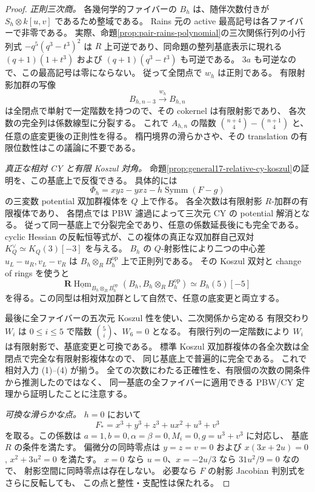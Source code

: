 \begin{proof}
\emph{正則三次商。}
各幾何学的ファイバーの $B_h$ は、随伴次数付きが
$S_h\otimes k[u,v]$ であるため整域である。
Rains 元の active 最高記号は各ファイバーで非零である。
実際、命題\ref{prop:pair-rains-polynomial}の三次関係行列の小行列式
$-q^5(q^3-t^3)^2$ は $R$ 上可逆であり、同命題の整列基底表示に現れる
$(q+1)(1+t^3)$ および $(q+1)(q^3-t^3)$ も可逆である。
$3a$ も可逆なので、この最高記号は零にならない。
従って全閉点で $w_h$ は正則である。
有限射影加群の写像
\[
 B_{h,n-3}\xrightarrow{w_h}B_{h,n}
\]
は全閉点で単射で一定階数を持つので、その cokernel は有限射影であり、
各次数の完全列は係数線型に分裂する。
これで $A_{h,n}$ の階数
$\binom{n+4}{4}-\binom{n+1}{4}$ と、任意の底変更後の正則性を得る。
楕円境界の滑らかさや、その translation の有限位数性はこの議論に不要である。

\emph{真正な相対 CY と有限 Koszul 対角。}
命題\ref{prop:general17-relative-cy-koszul}の証明を、この基底上で反復できる。
具体的には
\[
 \Phi_h=xyz-yxz-h\operatorname{Symm}(F-g)
\]
の三変数 potential 双加群複体を $Q$ 上で作る。
各全次数は有限射影 $R$-加群の有限複体であり、
各閉点では PBW 濾過によって三次元 CY の potential 解消となる。
従って同一基底上で分裂完全であり、任意の係数延長後にも完全である。
cyclic Hessian の反転恒等式が、この複体の真正な双加群自己双対
$K_Q^\vee\simeq K_Q(3)[-3]$ を与える。
$B_h$ の $Q$-射影性により二つの中心差
$u_L-u_R,v_L-v_R$ は $B_h\otimes_R B_h^{\mathrm{op}}$ 上で正則列である。
その Koszul 双対と change of rings を使うと
\[
 \mathbf R\underline{\operatorname{Hom}}_{B_h\otimes_RB_h^{\mathrm{op}}}
 (B_h,B_h\otimes_RB_h^{\mathrm{op}})\simeq B_h(5)[-5]
\]
を得る。この同型は相対双加群として自然で、任意の底変更と両立する。

最後に全ファイバーの五次元 Koszul 性を使い、二次関係から定める
有限交わり $W_i$ は $0\le i\le5$ で階数 $\binom5i$、$W_6=0$ となる。
有限行列の一定階数により $W_i$ は有限射影で、基底変更と可換である。
標準 Koszul 双加群複体の各全次数は全閉点で完全な有限射影複体なので、
同じ基底上で普遍的に完全である。
これで相対入力 (1)--(4) が揃う。
全ての次数にわたる正確性を、有限個の次数の開条件から推測したのではなく、
同一基底の全ファイバーに適用できる PBW/CY 定理から証明したことに注意する。

\emph{可換な滑らかな点。}
$h=0$ において
\[
 F_*=x^3+y^3+z^3+ux^2+u^3+v^3
\]
を取る。この係数は $a=1,b=0,\alpha=\beta=0,M_i=0,g=u^3+v^3$ に対応し、
基底 $R$ の条件を満たす。
偏微分の同時零点は $y=z=v=0$ および
$x(3x+2u)=0$, $x^2+3u^2=0$ を満たす。
$x=0$ なら $u=0$、$x=-2u/3$ なら $31u^2/9=0$ なので、
射影空間に同時零点は存在しない。
必要なら $F$ の射影 Jacobian 判別式をさらに反転しても、
この点と整性・支配性は保たれる。


\end{proof}
